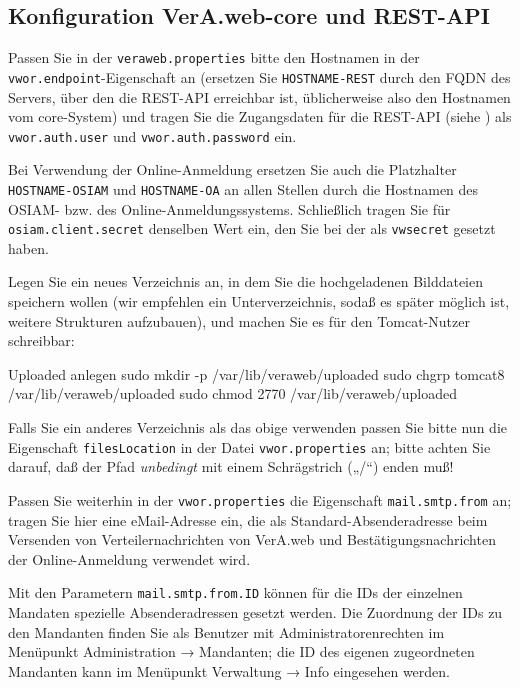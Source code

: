 \documentclass{tarentanleitung}
\begin{document}
\subsection{Konfiguration VerA.web-core und REST-API}\label{subsec:setup-core-files}

Passen Sie in der \texttt{veraweb.properties} bitte den Hostnamen
in der \texttt{vwor.endpoint}-Eigenschaft an (ersetzen Sie
\texttt{HOSTNAME-REST} durch den FQDN des Servers, über den die
REST-API erreichbar ist, üblicherweise also den Hostnamen vom
core-System) und tragen Sie die Zugangsdaten für die REST-API
(siehe ) als \texttt{vwor.auth.user}
und \texttt{vwor.auth.password} ein.

Bei Verwendung der Online-Anmeldung ersetzen Sie auch die Platzhalter
\texttt{HOSTNAME-OSIAM} und \texttt{HOSTNAME-OA} an allen Stellen
durch die Hostnamen des OSIAM- bzw. des Online-Anmeldungssystems.
Schließlich tragen Sie für \texttt{osiam.client.secret} denselben
Wert ein, den Sie bei der 
als \texttt{vwsecret} gesetzt haben.

\begin{minipage}{\linewidth}
Legen Sie ein neues Verzeichnis an, in dem Sie die hochgeladenen
Bilddateien speichern wollen (wir empfehlen ein Unterverzeichnis,
sodaß es später möglich ist, weitere Strukturen aufzubauen), und
machen Sie es für den Tomcat-Nutzer schreibbar:

\begin{lstdump}{Uploaded anlegen}
sudo mkdir -p /var/lib/veraweb/uploaded
sudo chgrp tomcat8 /var/lib/veraweb/uploaded
sudo chmod 2770 /var/lib/veraweb/uploaded
\end{lstdump}

Falls Sie ein anderes Verzeichnis als das obige verwenden passen
Sie bitte nun die Eigenschaft \texttt{filesLocation} in der Datei
\texttt{vwor.properties} an; bitte achten Sie darauf, daß der
Pfad \emph{unbedingt} mit einem Schrägstrich („/“) enden muß!
\end{minipage}

Passen Sie weiterhin in der \texttt{vwor.properties} die Eigenschaft
\texttt{mail.smtp.from} an; tragen Sie hier eine eMail-Adresse ein,
die als Standard-Absenderadresse beim Versenden von Verteilernachrichten
von VerA.web und Bestätigungsnachrichten der Online-Anmeldung verwendet wird.

Mit den Parametern \texttt{mail.smtp.from.ID} können für die IDs der einzelnen
Mandaten spezielle Absenderadressen gesetzt werden. Die Zuordnung der IDs zu
den Mandanten finden Sie als Benutzer mit Administratorenrechten im Menüpunkt
Administration → Mandanten; die ID des eigenen zugeordneten Mandanten kann
im Menüpunkt Verwaltung → Info eingesehen werden.
\end{document}

